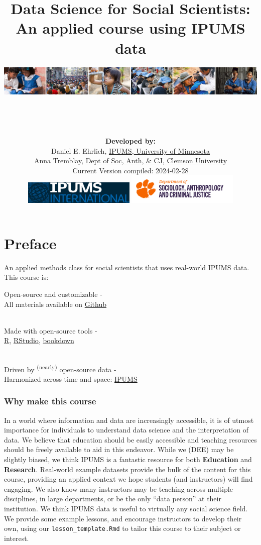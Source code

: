 \documentclass[
]{book}
\title{Data Science for Social Scientists: An applied course using IPUMS data}
\author{\includegraphics{ipums_banner.png}\\
\strut \\
\strut \\
\textbf{Developed by:}\\
\hspace*{0.333em}\hspace*{0.333em}\hspace*{0.333em}Daniel E. Ehrlich, \href{https://international.ipums.org/international/}{IPUMS, University of Minnesota}\\
\hspace*{0.333em}\hspace*{0.333em}\hspace*{0.333em}Anna Tremblay, \href{https://www.clemson.edu/cbshs/departments/sacj/degrees/anthropology.html}{Dept of Soc, Anth, \& CJ, Clemson University}\\
\hspace*{0.333em}\hspace*{0.333em}\hspace*{0.333em}Current Version compiled: 2024-02-28\\
\includegraphics[width=0.4\textwidth,height=\textheight]{ipums_i_logo.jpg} \includegraphics[width=0.4\textwidth,height=\textheight]{clemson_logo.png}\\
}
\date{}
\begin{document}
\maketitle

{
\setcounter{tocdepth}{1}
\tableofcontents
}
\hypertarget{preface}{%
\chapter*{Preface}\label{preface}}

An applied methods class for social scientists that uses real-world IPUMS data. This course is:

Open-source and customizable -\\
\hspace*{0.333em}\hspace*{0.333em}\hspace*{0.333em}All materials available on \href{https://github.com/ehrlichd/ipumsEDbook}{Github}\\
\strut \\
Made with open-source tools -\\
\hspace*{0.333em}\hspace*{0.333em}\href{https://cran.r-project.org/}{R}, \href{https://www.rstudio.com/products/rstudio/}{RStudio}, \href{https://bookdown.org/}{bookdown}\\
\strut \\
Driven by \textsuperscript{(nearly)} open-source data -\\
\hspace*{0.333em}\hspace*{0.333em}Harmonized across time and space: \href{https://ipums.org}{IPUMS}\\

\hypertarget{why-make-this-course}{%
\subsection*{Why make this course}\label{why-make-this-course}}

In a world where information and data are increasingly accessible, it is of utmost importance for individuals to understand data science and the interpretation of data. We believe that education should be easily accessible and teaching resources should be freely available to aid in this endeavor. While we (DEE) may be slightly biased, we think IPUMS is a fantastic resource for both \textbf{Education} and \textbf{Research}. Real-world example datasets provide the bulk of the content for this course, providing an applied context we hope students (and instructors) will find engaging. We also know many instructors may be teaching across multiple disciplines, in large departments, or be the only ``data person'' at their institution. We think IPUMS data is useful to virtually any social science field. We provide some example lessons, and encourage instructors to develop their own, using our \texttt{lesson\_template.Rmd} to tailor this course to their subject or interest.
\end{document}
